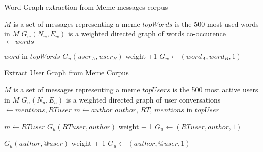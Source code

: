\begin{algorithm}[H]
    \caption{Word Graph extraction from Meme messages corpus}
    \label{algo:meme-graph}
    \begin{algorithmic}

        \Require $M$ is a set of messages representing a meme
        \State $topWords$ is the 500 most used words in $M$
        \State $G_w(N_w,E_w)$ is a weighted directed graph of words co-occurence
        \\
                \State {}  $ \gets words$

                \If $word$ in $topWords$
                            \State $G_u(user_A,user_B)$ weight +1
                        \Else
                            \State $G_w \gets (word_A,word_B, 1)$
                        \EndIf
                    \EndFor
                \EndIf
            \EndFor
        \EndFunction

    \end{algorithmic}
\end{algorithm}

\begin{algorithm}[H]
    \caption{Extract User Graph from Meme Corpus}
    \label{algo:meme-user-graph}
    \begin{algorithmic}
        \Require $M$ is a set of messages representing a meme
        \State $topUsers$ is the 500 most active users in $M$
        \State $G_u(N_u,E_u)$ is a weighted directed graph of user conversations
        \\
            \State {}  $ \gets mentions, RTuser$
                \State $m  \gets author$
                \If $author$, $RT$, $mentions$ in $topUser$ 
        
                        \State $m \gets RTuser$
                            \State $G_u(RTuser,author)$ weight + 1
                        \Else
                            \State $G_u \gets (RTuser,author, 1)$
                        \EndIf
                    \EndIf

                            \State $G_u(author,@user)$ weight + 1
                        \Else
                            \State $G_u \gets (author,@user, 1)$
                        \EndIf
                    \EndFor
                \EndIf

            \EndFor

        \EndFunction



    \end{algorithmic}
\end{algorithm}

